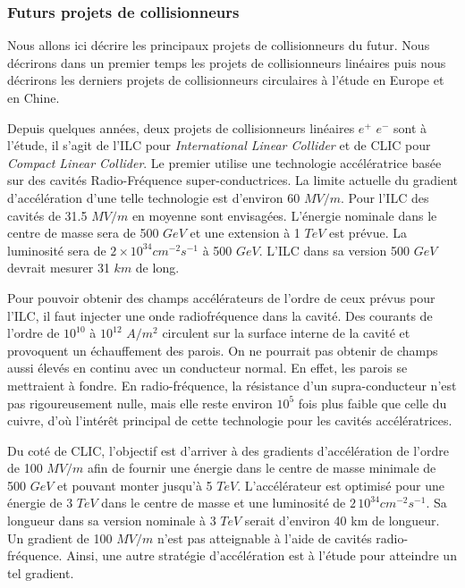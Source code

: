   \subsubsection{Futurs projets de collisionneurs}

  Nous allons ici décrire les principaux projets de collisionneurs du futur. Nous d\'ecrirons dans un premier temps les projets de collisionneurs lin\'eaires puis nous d\'ecrirons les derniers projets de collisionneurs circulaires \`a l'\'etude en Europe et en Chine. 
  
  \medskip
  
  Depuis quelques ann\'ees, deux projets de collisionneurs lin\'eaires $e^+$ $e^-$ sont \`a l'\'etude, il s'agit de l'ILC pour \textit{International Linear Collider} et de CLIC pour \textit{Compact Linear Collider}. Le premier utilise une technologie acc\'el\'eratrice bas\'ee sur des cavit\'es Radio-Fréquence super-conductrices. La limite actuelle du gradient d'acc\'el\'eration d'une telle technologie est d'environ 60 $MV/m$. Pour l'ILC  des cavit\'es de 31.5 $MV/m$ en moyenne sont envisag\'ees. L'\'energie nominale dans le centre de masse sera de 500 $GeV$ et une extension \`a 1 $TeV$ est pr\'evue. La luminosit\'e sera de $2 \times 10^{34} cm^{-2}s^{-1}$ \`a 500 $GeV$. L'ILC dans sa version 500 $GeV$ devrait mesurer 31 $km$ de long. 
  
  \medskip
  
  Pour pouvoir obtenir des champs acc\'el\'erateurs de l'ordre de ceux pr\'evus pour l'ILC, il faut injecter une onde radiofr\'equence dans la cavit\'e. Des courants de l'ordre de $10^{10}$ \`a $10^{12}$ $A/m^2$ circulent sur la surface interne de la cavit\'e et provoquent un échauffement des parois. On ne pourrait pas obtenir de champs aussi \'elev\'es en continu avec un conducteur normal. En effet, les parois se mettraient \`a fondre. En radio-fr\'equence, la r\'esistance d'un supra-conducteur n'est pas rigoureusement nulle, mais elle reste environ $10^5$ fois plus faible que celle du cuivre, d'o\`u l'intérêt principal de cette technologie pour les cavités accélératrices. 
  
  \medskip
  
  Du cot\'e de CLIC, l'objectif est d'arriver \`a des gradients d'acc\'el\'eration de l'ordre de 100 $MV/m$ afin de fournir une \'energie dans le centre de masse minimale de 500 $GeV$ et pouvant monter jusqu'\`a 5 $TeV$. L'acc\'el\'erateur est optimis\'e pour une \'energie de 3 $TeV$ dans le centre de masse et une luminosit\'e de $2 \, 10^{34} cm^{-2}s^{-1}$. Sa longueur dans sa version nominale \`a 3 $TeV$ serait d'environ 40 km de longueur. Un gradient de 100 $MV/m$ n'est pas atteignable \`a l'aide de cavit\'es radio-fr\'equence. Ainsi, une autre strat\'egie d'acc\'el\'eration est \`a l'\'etude pour atteindre un tel gradient.
  
